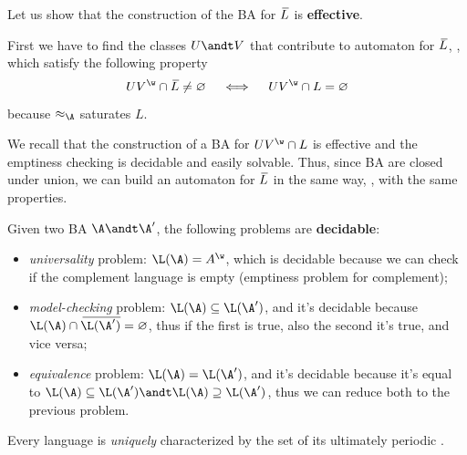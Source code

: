 \documentclass[oneside]{academica}
\begin{document}

Let us show that the construction of the BA for $\,\overline{\!{L}}$ is \textbf{effective}.

First we have to find the classes $U \andt V$ that contribute to automaton for $\,\overline{\!{L}}$, \ie, which satisfy the following property
\begin{equation*}
  UV^\w \cap \ol{L} \neq \emptyset \quad \iff \quad UV^\w \cap L = \emptyset
\end{equation*}
because $\approx_{\A}$ saturates $L$.

We recall that the construction of a BA for $UV^\w \cap L$ is effective and the emptiness checking is decidable and easily solvable.
Thus, since BA are closed under union, we can build an automaton for $\,\overline{\!{L}}$ in the same way, \ie, with the same properties.

\bigskip
Given two BA $\A \andt \A'$, the following problems are \textbf{decidable}:
\begin{itemize}
  \item \emph{universality} problem: $\L(\A) = \Aw$, which is decidable because we can check if the complement language is empty (emptiness problem for complement);
  \item \emph{model-checking} problem: $\L(\A) \subseteq \L(\A')$, and it's decidable because $\L(\A) \cap \ol{\L(\A')} = \emptyset$, thus if the first is true, also the second it's true, and vice versa;
  \item \emph{equivalence} problem: $\L(\A) = \L(\A')$, and it's decidable because it's equal to $\L(\A) \subseteq \L(\A') \andt \L(\A) \supseteq \L(\A')$, thus we can reduce both to the previous problem.
\end{itemize}

\begin{theorem}\label{thm:wreg_lang_char}
  Every \wreg language is \textit{uniquely} characterized by the set of its ultimately periodic \wwords.
\end{theorem}
\end{document}

